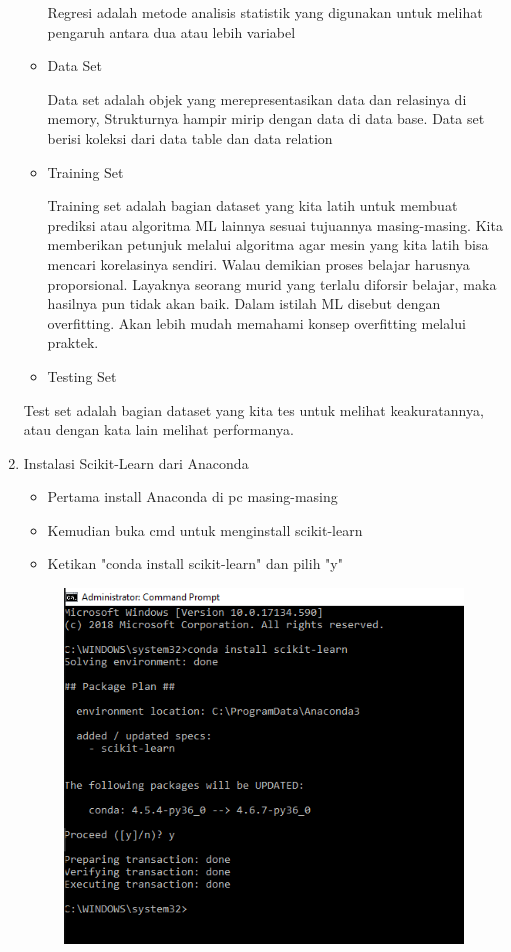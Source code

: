 \begin{enumerate}
\begin{itemize}
\par
Regresi adalah metode analisis statistik yang digunakan untuk melihat pengaruh antara dua atau lebih variabel
\item Data Set
\par
Data set adalah objek yang merepresentasikan data dan relasinya di memory, Strukturnya hampir mirip dengan data di data base. Data set berisi koleksi dari data table dan data relation 
\item Training Set
\par
Training set adalah bagian dataset yang kita latih untuk membuat prediksi atau algoritma ML lainnya sesuai tujuannya masing-masing. Kita memberikan petunjuk melalui algoritma agar mesin yang kita latih bisa mencari korelasinya sendiri. Walau demikian proses belajar harusnya proporsional. Layaknya seorang murid yang terlalu diforsir belajar, maka hasilnya pun tidak akan baik. Dalam istilah ML disebut dengan overfitting. Akan lebih mudah memahami konsep overfitting melalui praktek.
\item Testing Set
\end{itemize}
\par
Test set adalah bagian dataset yang kita tes untuk melihat keakuratannya, atau dengan kata lain melihat performanya.
\item Instalasi Scikit-Learn dari Anaconda
\begin{itemize}
\item Pertama install Anaconda di pc masing-masing
\item Kemudian buka cmd untuk menginstall scikit-learn
\item Ketikan "conda install scikit-learn" dan pilih "y"
\end{itemize}
\begin{figure}[ht]
\centering
\includegraphics[scale=0.6]{figures/puad1.png}

\end{figure}
\end{enumerate}
